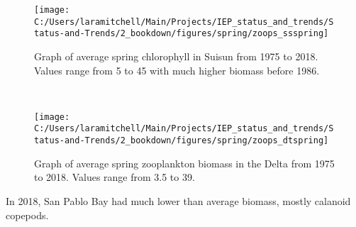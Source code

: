 \documentclass[
]{book}
\begin{document}
\begin{panel-grid}
\begin{columns-nocenter}
\begin{column40}
\end{column40}

\begin{column800}

\begin{expand}

\begin{figure}
\texttt{[image: C:/Users/laramitchell/Main/Projects/IEP\_status\_and\_trends/Status-and-Trends/2\_bookdown/figures/spring/zoops\_ssspring]} \caption{Graph of average spring chlorophyll in Suisun from 1975 to 2018. Values range from 5 to 45 with much higher biomass before 1986.}\label{fig:unnamed-chunk-28}
\end{figure}

\end{expand}

\end{column800}

\begin{column40}

~

\end{column40}

\begin{column800}

\begin{expand}

\begin{figure}
\texttt{[image: C:/Users/laramitchell/Main/Projects/IEP\_status\_and\_trends/Status-and-Trends/2\_bookdown/figures/spring/zoops\_dtspring]} \caption{Graph of average spring zooplankton biomass in the Delta from 1975 to 2018. Values range from 3.5 to 39.}\label{fig:unnamed-chunk-29}
\end{figure}

\end{expand}

\end{column800}

\end{columns-nocenter}

\begin{columns-nocenter}

\begin{column800}

In 2018, San Pablo Bay had much lower than average biomass, mostly calanoid copepods.

\end{column800}

\begin{column40}


\end{column40}
\end{columns-nocenter}
\end{panel-grid}
\end{document}
